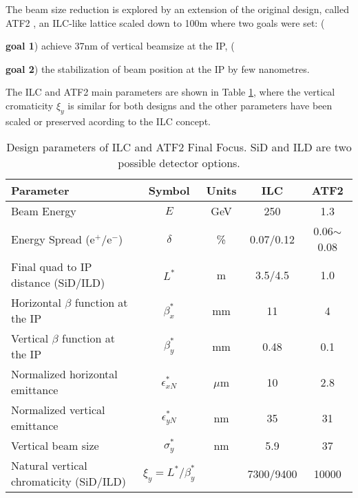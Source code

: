 The beam size reduction is explored by an extension of the original design, called ATF2 \cite{ATF2prop,grishanov:in2p3-00309474}, an ILC-like lattice scaled down to 100m where two goals were set: ({\textbf{goal 1}) achieve 37nm of vertical beamsize at the IP, ({\textbf{goal 2}) the stabilization of beam position at the IP by few nanometres.\par
The ILC and ATF2 main parameters are shown in Table \ref{t:ILC_ATF2param}, where the vertical cromaticity $\xi_y$ is similar for both designs and the other parameters have been scaled or preserved acording to the ILC concept. 
\begin{table}[hbt]
\centering
\begin{tabular}{l|c|c||c|c}\hline\hline
Parameter & Symbol & Units & ILC & ATF2\\\hline\hline
Beam Energy & $E$ & GeV & 250 & 1.3 \\\hline
Energy Spread (e$^+$/e$^-$) & $\delta$ & \% & 0.07/0.12 & 0.06$\sim$0.08\\\hline
Final quad to IP distance (SiD/ILD) & $L^*$ & m & 3.5/4.5 & 1.0\\\hline
Horizontal $\beta$ function at the IP & $\beta^*_x$ & mm & 11 & 4\\\hline
Vertical $\beta$ function at the IP & $\beta^*_y$ & mm & 0.48 & 0.1\\\hline
Normalized horizontal emittance & $\epsilon^*_{xN}$ & $\mu$m & 10 & 2.8\\\hline
Normalized vertical emittance & $\epsilon^*_{yN}$ & nm & 35 & 31\\\hline
Vertical beam size & $\sigma^*_y$ & nm & 5.9 & 37\\\hline
Natural vertical chromaticity (SiD/ILD)& $\xi_y=L^*/\beta^*_y$ &  & 7300/9400 & 10000\\\hline
\end{tabular}\caption{Design parameters of ILC and ATF2 Final Focus. SiD and ILD are two possible detector options.}\label{t:ILC_ATF2param}
\end{table}\par
}}
